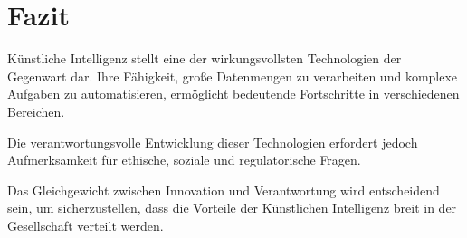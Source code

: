 \documentclass[11pt]{article}
\begin{document}
\section{Fazit}

Künstliche Intelligenz stellt eine der wirkungsvollsten Technologien der Gegenwart dar. Ihre Fähigkeit, große Datenmengen zu verarbeiten und komplexe Aufgaben zu automatisieren, ermöglicht bedeutende Fortschritte in verschiedenen Bereichen.

Die verantwortungsvolle Entwicklung dieser Technologien erfordert jedoch Aufmerksamkeit für ethische, soziale und regulatorische Fragen.

Das Gleichgewicht zwischen Innovation und Verantwortung wird entscheidend sein, um sicherzustellen, dass die Vorteile der Künstlichen Intelligenz breit in der Gesellschaft verteilt werden.  
\end{document}
